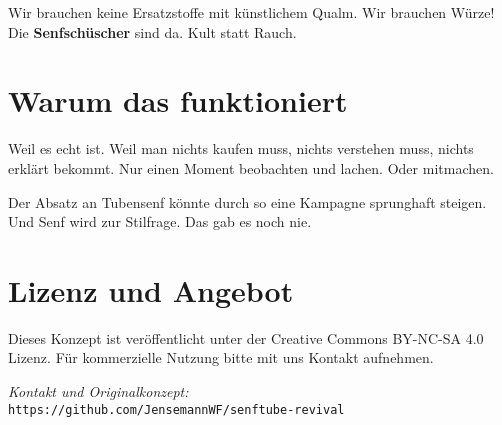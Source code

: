 \documentclass[12pt]{article}
\begin{document}
Wir brauchen keine Ersatzstoffe mit künstlichem Qualm. Wir brauchen Würze! Die \textbf{Senfschüscher} sind da. Kult statt Rauch.

\section*{Warum das funktioniert}
Weil es echt ist. Weil man nichts kaufen muss, nichts verstehen muss, nichts erklärt bekommt. Nur einen Moment beobachten und lachen. Oder mitmachen.

Der Absatz an Tubensenf könnte durch so eine Kampagne sprunghaft steigen. Und Senf wird zur Stilfrage. Das gab es noch nie.

\section*{Lizenz und Angebot}
Dieses Konzept ist veröffentlicht unter der Creative Commons BY-NC-SA 4.0 Lizenz. Für kommerzielle Nutzung bitte mit uns Kontakt aufnehmen.

\bigskip
\textit{Kontakt und Originalkonzept:}\\
\texttt{https://github.com/JensemannWF/senftube-revival}
\end{document}
